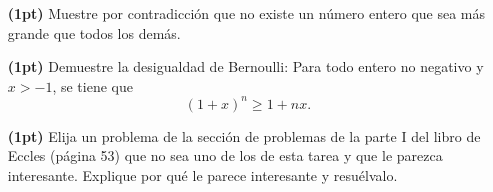\documentclass{article}
\begin{document}
\begin{itemize}
    \item[\bf (1pt)] Muestre por contradicción que no existe un número entero que sea más grande que todos los demás.
    \item[\bf (1pt)] Demuestre la desigualdad de Bernoulli: Para todo entero no negativo y $x > -1$, se tiene que
            $$ (1+x)^n \geq 1 + nx. $$
        \item[\bf (1pt)] Elija un problema de la sección de problemas de la parte I del libro de Eccles (página 53) que no sea uno de los de esta tarea y que le parezca interesante. Explique por qué le parece interesante y resuélvalo. 

\end{itemize} %

\vspace{1cm}
\end{document}
